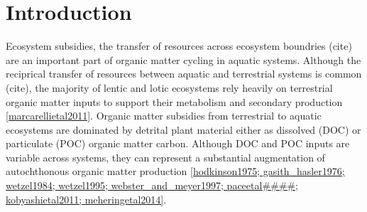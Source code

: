 \section{Introduction}
Ecosystem subsidies, the transfer of resources across ecosystem boundries (cite) are an important part of organic matter cycling in aquatic systems. Although the reciprical transfer of resources between aquatic and terrestrial systems is common (cite), the majority of lentic and lotic ecosystems rely heavily on terrestrial organic matter inputs to support their metabolism and secondary production \ref{marcarellietal2011}. Organic matter subsidies from terrestrial to aquatic ecosystems are dominated by detrital plant material either as dissolved (DOC) or particulate (POC) organic matter carbon. Although DOC and POC inputs are variable across systems, they can represent a substantial augmentation of autochthonous organic matter production \ref{hodkinson1975; gasith_hasler1976; wetzel1984; wetzel1995; webster_and_meyer1997; paceetal####; kobyashietal2011; meheringetal2014}.    



